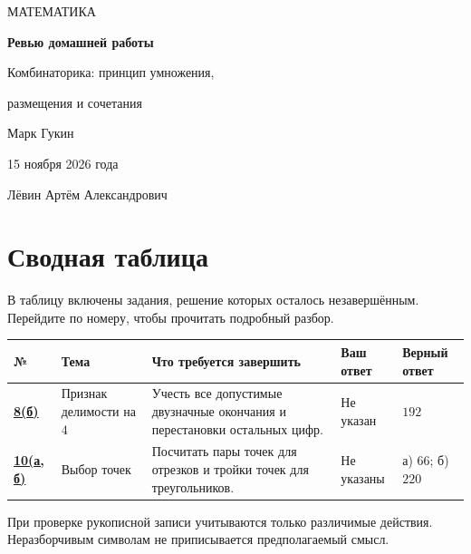 \documentclass[a4paper,11pt]{article}
\begin{document}
\thispagestyle{empty}
\begin{center}
\vspace*{37mm}
{\large\color{accentdark} МАТЕМАТИКА}\par
\vspace{18mm}
{\LARGE\bfseries\color{ink} Ревью домашней работы}\par
\vspace{7mm}
{\large\color{accentdark} Комбинаторика: принцип умножения,\par размещения и сочетания}\par
\vspace{30mm}
{\large Марк Гукин}\par
\vspace{16mm}
{\large 15 ноября 2026 года}\par
\vspace{8mm}
{\large Лёвин Артём Александрович}\par
\end{center}
\vfill
\begin{center}
\end{center}
\clearpage

\section*{Сводная таблица}
В таблицу включены задания, решение которых осталось незавершённым. Перейдите по номеру, чтобы прочитать подробный разбор.
\par\vspace{7pt}
\renewcommand{\arraystretch}{1.5}
\small
\noindent\begin{tabularx}{\linewidth}{@{}p{13mm}p{26mm}X p{24mm}p{25mm}@{}}
\toprule
\textbf{№} & \textbf{Тема} & \textbf{Что требуется завершить} & \textbf{Ваш ответ} & \textbf{Верный ответ}\\
\midrule
\hyperref[task:8b]{\textbf{8(б)}} & Признак делимости на $4$ & Учесть все допустимые двузначные окончания и перестановки остальных цифр. & Не указан & $192$\\
\hyperref[task:10]{\textbf{10(а, б)}} & Выбор точек & Посчитать пары точек для отрезков и тройки точек для треугольников. & Не указаны & а) $66$; б) $220$\\
\bottomrule
\end{tabularx}
\normalsize
\vfill
{\footnotesize\color{softgray} При проверке рукописной записи учитываются только различимые действия. Неразборчивым символам не приписывается предполагаемый смысл.}
\clearpage
\end{document}
